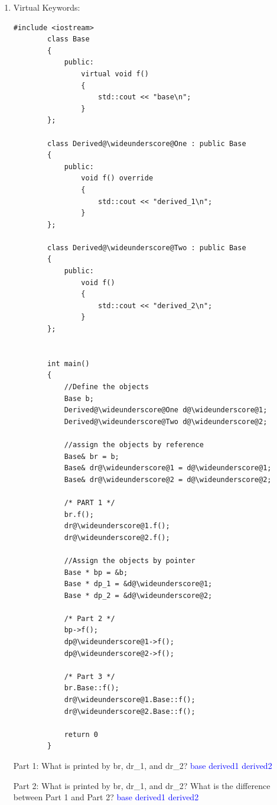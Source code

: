 \documentclass{article}
\newcommand{\wideunderscore}{\underline{\hphantom{n}}}
\begin{document}
\begin{enumerate}[label=(\alph*)]
    \item Virtual Keywords:
    \begin{lstlisting}[style = CStyle]
        #include <iostream>
        class Base
        {
            public: 
                virtual void f()
                {
                    std::cout << "base\n";
                }
        };

        class Derived@\wideunderscore@One : public Base
        {
            public:
                void f() override
                {
                    std::cout << "derived_1\n";
                }
        };

        class Derived@\wideunderscore@Two : public Base 
        {
            public: 
                void f()
                {
                    std::cout << "derived_2\n";
                }
        };

    
        int main()
        {
            //Define the objects
            Base b;
            Derived@\wideunderscore@One d@\wideunderscore@1;
            Derived@\wideunderscore@Two d@\wideunderscore@2;

            //assign the objects by reference
            Base& br = b;
            Base& dr@\wideunderscore@1 = d@\wideunderscore@1;
            Base& dr@\wideunderscore@2 = d@\wideunderscore@2;

            /* PART 1 */
            br.f();
            dr@\wideunderscore@1.f();
            dr@\wideunderscore@2.f();

            //Assign the objects by pointer
            Base * bp = &b;
            Base * dp_1 = &d@\wideunderscore@1;
            Base * dp_2 = &d@\wideunderscore@2;

            /* Part 2 */
            bp->f();
            dp@\wideunderscore@1->f();
            dp@\wideunderscore@2->f();

            /* Part 3 */
            br.Base::f();
            dr@\wideunderscore@1.Base::f();
            dr@\wideunderscore@2.Base::f();

            return 0
        }
    \end{lstlisting}
    Part 1:
    What is printed by br, dr\_1, and dr\_2?
    \newline\textcolor{blue}{base}
    \newline\textcolor{blue}{derived\@\wideunderscore\@1}
    \newline\textcolor{blue}{derived\@\wideunderscore\@2}
    
    \vspace{2cm}
    Part 2:
    What is printed by br, dr\_1, and dr\_2? What is the difference between Part 1 and Part 2?
    \newline\textcolor{blue}{base}
    \newline\textcolor{blue}{derived\@\wideunderscore\@1}
    \newline\textcolor{blue}{derived\@\wideunderscore\@2}
    

\end{enumerate}
\end{document}
